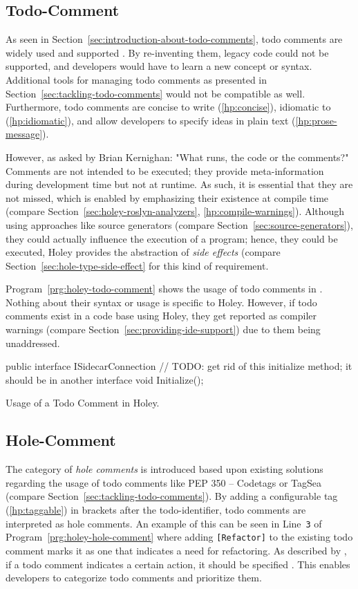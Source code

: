 \subsection{Todo-Comment}
As seen in Section~\ref{sec:introduction-about-todo-comments}, todo comments are widely used and supported \cite{jetbrains_todo_2023}.
By re-inventing them, legacy code could not be supported, and developers would have to learn a new concept or syntax.
Additional tools for managing todo comments as presented in Section~\ref{sec:tackling-todo-comments} would not be compatible as well.
Furthermore, todo comments are concise to write (\ref{hp:concise}), idiomatic to \CS (\ref{hp:idiomatic}), and allow developers to specify ideas in plain text (\ref{hp:prose-message}).

However, as asked by Brian Kernighan: "What runs, the code or the comments?"
Comments are not intended to be executed; they provide meta-information during development time but not at runtime.
As such, it is essential that they are not missed, which is enabled by emphasizing their existence at compile time (compare Section~\ref{sec:holey-roslyn-analyzers}, \ref{hp:compile-warnings}).
Although using approaches like source generators (compare Section~\ref{sec:source-generators}), they could actually influence the execution of a program; hence, they could be executed, Holey provides the abstraction of \emph{side effects} (compare Section~\ref{sec:hole-type-side-effect} for this kind of requirement.

Program~\ref{prg:holey-todo-comment} shows the usage of todo comments in \CS.
Nothing about their syntax or usage is specific to Holey.
However, if todo comments exist in a code base using Holey, they get reported as compiler warnings (compare Section~\ref{sec:providing-ide-support}) due to them being unaddressed.

\begin{program}[ht]
\begin{CsCode}
public interface ISidecarConnection
{
	// TODO: get rid of this initialize method; it should be in another interface
	void Initialize();
}
\end{CsCode}
\caption{Usage of a Todo Comment in Holey.}
\label{prg:holey-todo-comment}
\end{program}

\subsection{Hole-Comment}
The category of \emph{hole comments} is introduced based upon existing solutions regarding the usage of todo comments like PEP 350 -- Codetags or TagSea (compare Section~\ref{sec:tackling-todo-comments}).
By adding a configurable tag (\ref{hp:taggable}) in brackets after the todo-identifier, todo comments are interpreted as hole comments.
An example of this can be seen in Line~\verb|3| of Program~\ref{prg:holey-hole-comment} where adding \verb|[Refactor]| to the existing todo comment marks it as one that indicates a need for refactoring.
As described by \citeauthor{goldin_stop_2022}, if a todo comment indicates a certain action, it should be specified \cite{goldin_stop_2022}.
This enables developers to categorize todo comments and prioritize them.


